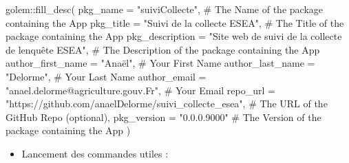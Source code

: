 \documentclass[
  letterpaper,
  DIV=11,
  numbers=noendperiod]{scrreprt}
\newenvironment{Shaded}{\begin{snugshade}}{\end{snugshade}}
\newcommand{\AttributeTok}[1]{\textcolor[rgb]{0.40,0.45,0.13}{#1}}
\newcommand{\CommentTok}[1]{\textcolor[rgb]{0.37,0.37,0.37}{#1}}
\newcommand{\FunctionTok}[1]{\textcolor[rgb]{0.28,0.35,0.67}{#1}}
\newcommand{\NormalTok}[1]{\textcolor[rgb]{0.00,0.23,0.31}{#1}}
\newcommand{\SpecialCharTok}[1]{\textcolor[rgb]{0.37,0.37,0.37}{#1}}
\newcommand{\StringTok}[1]{\textcolor[rgb]{0.13,0.47,0.30}{#1}}
\providecommand{\tightlist}{%
  \setlength{\itemsep}{0pt}\setlength{\parskip}{0pt}}\usepackage{longtable,booktabs,array}
\begin{document}
\begin{Shaded}
\begin{Highlighting}[]
\NormalTok{golem}\SpecialCharTok{::}\FunctionTok{fill\_desc}\NormalTok{(}
  \AttributeTok{pkg\_name =} \StringTok{"suiviCollecte"}\NormalTok{, }\CommentTok{\# The Name of the package containing the App}
  \AttributeTok{pkg\_title =} \StringTok{"Suivi de la collecte ESEA"}\NormalTok{, }\CommentTok{\# The Title of the package containing the App}
  \AttributeTok{pkg\_description =} \StringTok{"Site web de suivi de la collecte de l\textquotesingle{}enquête ESEA"}\NormalTok{, }\CommentTok{\# The Description of the package containing the App}
  \AttributeTok{author\_first\_name =} \StringTok{"Anaël"}\NormalTok{, }\CommentTok{\# Your First Name}
  \AttributeTok{author\_last\_name =} \StringTok{"Delorme"}\NormalTok{, }\CommentTok{\# Your Last Name}
  \AttributeTok{author\_email =} \StringTok{"anael.delorme@agriculture.gouv.Fr"}\NormalTok{, }\CommentTok{\# Your Email}
  \AttributeTok{repo\_url =} \StringTok{"https://github.com/anaelDelorme/suivi\_collecte\_esea"}\NormalTok{, }\CommentTok{\# The URL of the GitHub Repo (optional),}
  \AttributeTok{pkg\_version =} \StringTok{"0.0.0.9000"} \CommentTok{\# The Version of the package containing the App}
\NormalTok{)}
\end{Highlighting}
\end{Shaded}

\begin{itemize}
\tightlist
\item
  Lancement des commandes utiles :
\end{itemize}
\end{document}

